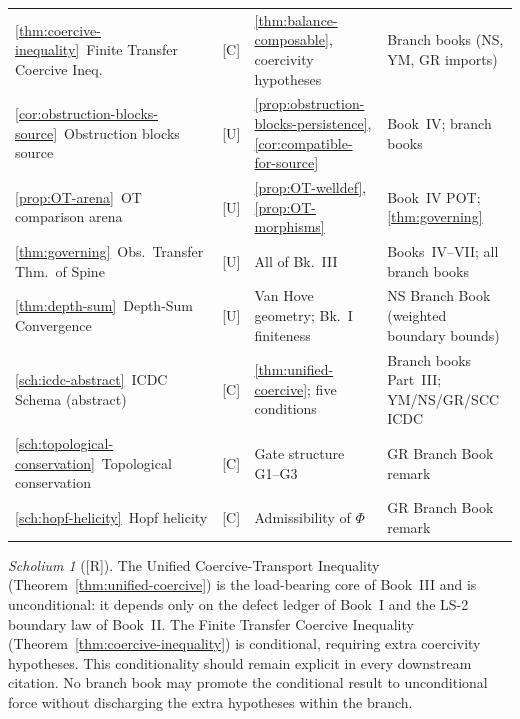\documentclass[12pt,oneside]{amsbook}
\theoremstyle{plain}
\theoremstyle{definition}
\theoremstyle{remark}
\newtheorem{scholium}[theorem]{Scholium}
\newcommand{\status}[1]{\textup{[#1]}}
\begin{document}
\begin{tabular}{@{}p{4.0cm}p{0.8cm}p{3.6cm}p{4.6cm}@{}}
\ref{thm:coercive-inequality}\ Finite Transfer Coercive Ineq.
  & [C] & \ref{thm:balance-composable}, coercivity hypotheses
  & Branch books (NS, YM, GR imports) \\

\ref{cor:obstruction-blocks-source}\ Obstruction blocks source
  & [U] & \ref{prop:obstruction-blocks-persistence}, \ref{cor:compatible-for-source}
  & Book~IV; branch books \\

\ref{prop:OT-arena}\ OT comparison arena
  & [U] & \ref{prop:OT-welldef}, \ref{prop:OT-morphisms}
  & Book~IV POT; \ref{thm:governing} \\

\ref{thm:governing}\ Obs.\ Transfer Thm.\ of Spine
  & [U] & All of Bk.~III
  & Books~IV--VII; all branch books \\

\ref{thm:depth-sum}\ Depth-Sum Convergence
  & [U] & Van Hove geometry; Bk.~I finiteness
  & NS Branch Book (weighted boundary bounds) \\

\ref{sch:icdc-abstract}\ ICDC Schema (abstract)
  & [C] & \ref{thm:unified-coercive}; five conditions
  & Branch books Part~III; YM/NS/GR/SCC ICDC \\

\ref{sch:topological-conservation}\ Topological conservation
  & [C] & Gate structure G1--G3
  & GR Branch Book remark \\

\ref{sch:hopf-helicity}\ Hopf helicity
  & [C] & Admissibility of $\Phi$
  & GR Branch Book remark \\
\hline
\end{tabular}
\renewcommand{\arraystretch}{1}

\medskip

\begin{scholium}[\status{R}]\label{sch:book-iii-honest-status}
The Unified Coercive-Transport Inequality
(Theorem~\ref{thm:unified-coercive}) is the load-bearing core of
Book~III and is unconditional: it depends only on the defect ledger of
Book~I and the LS-2 boundary law of Book~II.  The Finite Transfer
Coercive Inequality (Theorem~\ref{thm:coercive-inequality}) is
conditional, requiring extra coercivity hypotheses.  This conditionality
should remain explicit in every downstream citation.  No branch book
may promote the conditional result to unconditional force without
discharging the extra hypotheses within the branch.
\end{scholium}
\end{document}
